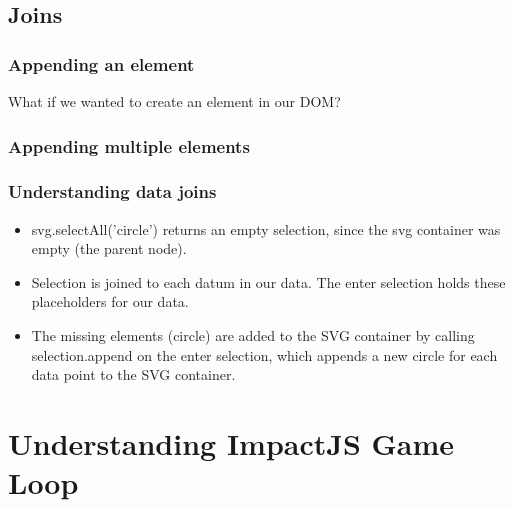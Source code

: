\documentclass[red]{beamer}
\begin{document}
\subsection{Joins}
\begin{frame}
    \frametitle{Appending an element}
    What if we wanted to create an element in our DOM?

    \lstllll
\end{frame}

\begin{frame}
    \frametitle{Appending multiple elements}
    \lstlllll
\end{frame}

\begin{frame}
    \frametitle{Understanding data joins}
    \begin{itemize}
    \item<1 -> svg.selectAll('circle') returns an empty selection, since
    the svg container was empty (the parent node).
    \item<2 -> Selection is joined to each datum in our data. The enter selection holds these placeholders for our data.
    \item<3 -> The missing elements (circle) are added to the SVG container
    by calling selection.append on the enter selection, which appends a new
    circle for each data point to the SVG container. 
    \end{itemize}
\end{frame}

\section{Understanding ImpactJS Game Loop}
\end{document}
